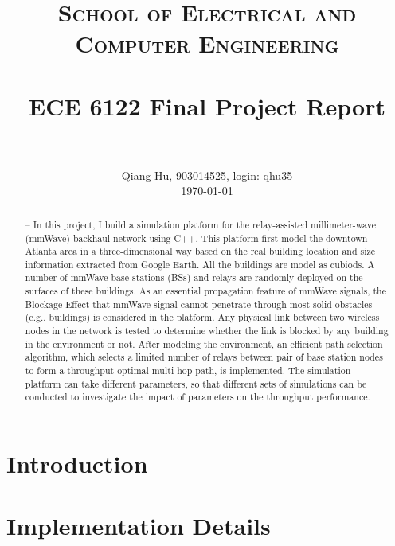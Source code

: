 \documentclass[paper=a4, fontsize=11pt]{scrartcl}
\title{
		\usefont{OT1}{bch}{b}{n}
		\normalfont \normalsize \textsc{School of Electrical and Computer Engineering} \\ [25pt]
		\horrule{0.5pt} \\[0.4cm]
		\huge ECE 6122 Final Project Report \\
		\horrule{2pt} \\[0.5cm]
}
\author{
		\normalfont 								\normalsize
        Qiang Hu, 903014525, login: qhu35\\[-3pt]		\normalsize
        \today
}
\date{}
\numberwithin{equation}{section}		%
\numberwithin{figure}{section}			%
\numberwithin{table}{section}				%
\begin{document}
\maketitle
\begin{abstract}
\abstractname{--}
In this project, I build a simulation platform for the relay-assisted millimeter-wave (mmWave) backhaul network using C++. This platform first model the downtown Atlanta area in a three-dimensional way based on the real building location and size information extracted from Google Earth. All the buildings are model as cubiods. A number of mmWave base stations (BSs) and relays are randomly deployed on the surfaces of these buildings. As an essential propagation feature of mmWave signals, the Blockage Effect that mmWave signal cannot penetrate through most solid obstacles (e.g., buildings) is considered in the platform. Any physical link between two wireless nodes in the network is tested to determine whether the link is blocked by any building in the environment or not. After modeling the environment, an efficient path selection algorithm, which selects a limited number of relays between pair of base station nodes to form a throughput optimal multi-hop path, is implemented. The simulation platform can take different parameters, so that different sets of simulations can be conducted to investigate the impact of parameters on the throughput performance.
\end{abstract}

\section{Introduction}

\section{Implementation Details}
\end{document}
